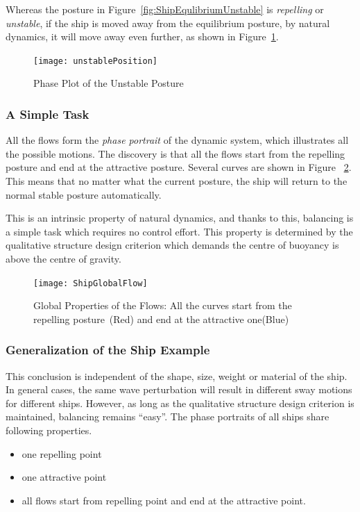 Whereas the  posture in Figure~\ref{fig:ShipEqulibriumUnstable} is \emph{repelling} or \emph{unstable}, if the ship is moved away from the equilibrium posture,  by natural dynamics, it will move away even further, as shown in Figure~\ref{fig:unStablePosture}.

\begin{figure}[!htbp]
  \begin{center}
      \texttt{[image: unstablePosition]}
    \caption{Phase Plot of the Unstable Posture}
    \label{fig:unStablePosture}
  \end{center}
\end{figure}


\subsubsection*{A Simple Task}
All the flows form the \emph{phase portrait} of the dynamic system, which illustrates all the possible motions. 
The discovery is that all the flows start from the repelling posture and end at the attractive posture.
Several curves are shown in Figure ~\ref{fig:globalflow}.
This means that no matter what the current posture, the ship will return to the normal stable posture automatically.

This is an intrinsic property of natural dynamics, and thanks to this, balancing is a simple task which requires no control effort. 
This property is determined by the qualitative structure design criterion which demands the centre of buoyancy  is above the centre of gravity.

\begin{figure}[!htbp]
  \begin{center}
   \texttt{[image: ShipGlobalFlow]}
   \caption{Global Properties of the Flows: All the curves start from the repelling posture~(Red) and end at the attractive one(Blue)}
   \label{fig:globalflow}
  \end{center}
\end{figure}

 



\subsubsection*{Generalization of the Ship Example} 
This conclusion is independent of the shape, size, weight or material of the ship. 
In general cases, the same wave perturbation will result in different sway motions for different ships.
However, as long as the qualitative structure design criterion is maintained, balancing remains ``easy''.
The phase portraits of all  ships share following properties. 
\begin{itemize}
\item one repelling point 
\item one attractive point 
\item all flows start from repelling point and end at the  attractive point. 
\end{itemize}

